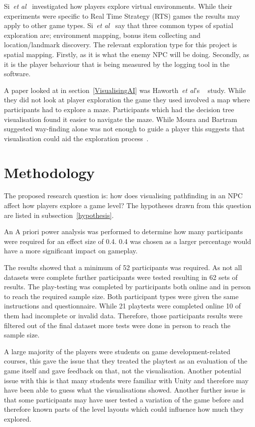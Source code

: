 \documentclass[journal]{IEEEtran}
\begin{document}
	Si~\textit{et al}~\cite{si2017} investigated how players explore virtual environments. While their experiments were specific to Real Time Strategy (RTS) games the results may apply to other game types. Si~\textit{et al}~\cite{si2017} say that three common types of spatial exploration are; environment mapping, bonus item collecting and location/landmark discovery. The relevant exploration type for this project is spatial mapping. Firstly, as it is what the enemy NPC will be doing.  Secondly, as it is the player behaviour that is being measured by the logging tool in the software.
	
	A paper looked at in section~\ref{VisualisingAI} was Haworth~\textit{et al}'s ~\cite{Haworth2010} study. While they did not look at player exploration the game they used involved a map where participants had to explore a maze. Participants which had the decision tree visualisation found it easier to navigate the maze. While Moura and Bartram~\cite{moura2014} suggested way-finding alone was not enough to guide a player this suggests that visualisation could aid the exploration process~\cite{Haworth2010}.
	
	\section{Methodology} \label{methodology}
	The proposed research question is: how does visualising pathfinding in an NPC affect how players explore a game level? The hypotheses drawn from this question are listed in subsection~\ref{hypothesis}.  
	
	An A priori power analysis was performed to determine how many participants were required for an effect size of 0.4. 0.4 was chosen as a larger percentage would have a more significant impact on gameplay.
	
	The results showed that a minimum of 52 participants was required. As not all datasets were complete further participants were tested resulting in 62 sets of results.     
	The play-testing was completed by participants both online and in person to reach the required sample size. Both participant types were given the same instructions and questionnaire. While 21 playtests were completed online 10 of them had incomplete or invalid data. Therefore, those participants results were filtered out of the final dataset more tests were done in person to reach the sample size.
	
	A large majority of the players were students on game development-related courses, this gave the issue that they treated the playtest as an evaluation of the game itself and gave feedback on that, not the visualisation.  Another potential issue with this is that many students were familiar with Unity and therefore may have been able to guess what the visualisations showed. 
	Another further issue is that some participants may have user tested a variation of the game before and therefore known parts of the level layouts which could influence how much they explored. 
	
\end{document}
